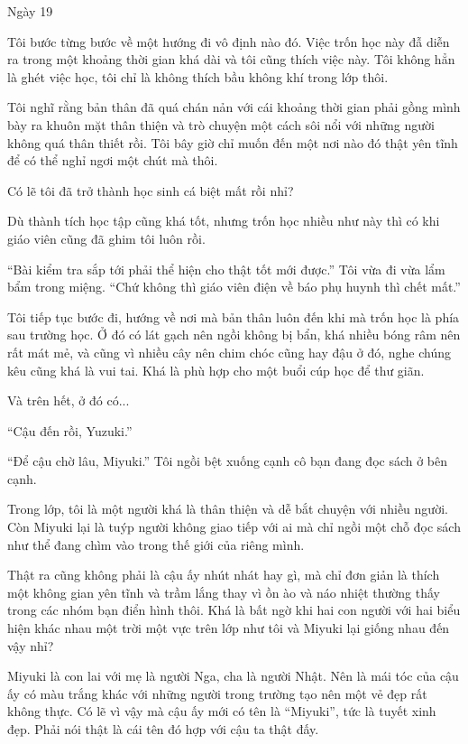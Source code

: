 {Ngày 19}
{
Tôi bước từng bước về một hướng đi vô định nào đó. Việc trốn học này đẫ
diễn ra trong một khoảng thời gian khá dài và tôi cũng thích việc này.
Tôi không hẳn là ghét việc học, tôi chỉ là không thích bầu không khí
trong lớp thôi.

Tôi nghĩ rằng bản thân đã quá chán nản với cái khoảng thời gian phải
gồng mình bày ra khuôn mặt thân thiện và trò chuyện một cách sôi nổi với
những người không quá thân thiết rồi. Tôi bây giờ chỉ muốn đến một nơi
nào đó thật yên tĩnh để có thể nghỉ ngơi một chút mà thôi.

Có lẽ tôi đã trở thành học sinh cá biệt mất rồi nhỉ?

Dù thành tích học tập cũng khá tốt, nhưng trốn học nhiều như này thì có
khi giáo viên cũng đã ghim tôi luôn rồi.

``Bài kiểm tra sắp tới phải thể hiện cho thật tốt mới được.'' Tôi vừa đi
vừa lẩm bẩm trong miệng. ``Chứ không thì giáo viên điện về báo phụ huynh
thì chết mất.''

Tôi tiếp tục bước đi, hướng về nơi mà bản thân luôn đến khi mà trốn học
là phía sau trường học. Ở đó có lát gạch nên ngồi không bị bẩn, khá
nhiều bóng râm nên rất mát mẻ, và cũng vì nhiều cây nên chim chóc cũng
hay đậu ở đó, nghe chúng kêu cũng khá là vui tai. Khá là phù hợp cho một
buổi cúp học để thư giãn.

Và trên hết, ở đó có...

``Cậu đến rồi, Yuzuki.''

``Để cậu chờ lâu, Miyuki.'' Tôi ngồi bệt xuống cạnh cô bạn đang đọc sách
ở bên cạnh.

Trong lớp, tôi là một người khá là thân thiện và dễ bắt chuyện với nhiều
người. Còn Miyuki lại là tuýp người không giao tiếp với ai mà chỉ ngồi
một chỗ đọc sách như thể đang chìm vào trong thế giới của riêng mình.

Thật ra cũng không phải là cậu ấy nhút nhát hay gì, mà chỉ đơn giản là
thích một không gian yên tĩnh và trầm lắng thay vì ồn ào và náo nhiệt
thường thấy trong các nhóm bạn điển hình thôi. Khá là bất ngờ khi hai
con người với hai biểu hiện khác nhau một trời một vực trên lớp như tôi
và Miyuki lại giống nhau đến vậy nhỉ?

Miyuki là con lai với mẹ là người Nga, cha là người Nhật. Nên là mái tóc
của cậu ấy có màu trắng khác với những người trong trường tạo nên một vẻ
đẹp rất không thực. Có lẽ vì vậy mà cậu ấy mới có tên là ``Miyuki'', tức
là tuyết xinh đẹp. Phải nói thật là cái tên đó hợp với cậu ta thật đấy.

}
